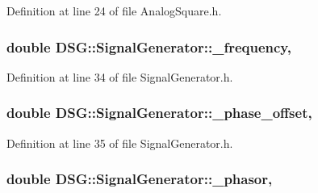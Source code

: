 Definition at line 24 of file Analog\-Square.\-h.

\hypertarget{classDSG_1_1SignalGenerator_a67e296e3506dcdf09402c667cddff9ac}{
\subsubsection[{\-\_\-frequency}]{\setlength{\rightskip}{0pt plus 5cm}double D\-S\-G\-::\-Signal\-Generator\-::\-\_\-frequency\hspace{0.3cm}{\ttfamily [protected]}, {\ttfamily [inherited]}}}\label{classDSG_1_1SignalGenerator_a67e296e3506dcdf09402c667cddff9ac}


Definition at line 34 of file Signal\-Generator.\-h.

\hypertarget{classDSG_1_1SignalGenerator_a9abf9d00c798e0fdca6314f17547758a}{
\subsubsection[{\-\_\-phase\-\_\-offset}]{\setlength{\rightskip}{0pt plus 5cm}double D\-S\-G\-::\-Signal\-Generator\-::\-\_\-phase\-\_\-offset\hspace{0.3cm}{\ttfamily [protected]}, {\ttfamily [inherited]}}}\label{classDSG_1_1SignalGenerator_a9abf9d00c798e0fdca6314f17547758a}


Definition at line 35 of file Signal\-Generator.\-h.

\hypertarget{classDSG_1_1SignalGenerator_ac2271b582bf699275f077ecb642a8cd9}{
\subsubsection[{\-\_\-phasor}]{\setlength{\rightskip}{0pt plus 5cm}double D\-S\-G\-::\-Signal\-Generator\-::\-\_\-phasor\hspace{0.3cm}{\ttfamily [protected]}, {\ttfamily [inherited]}}}\label{classDSG_1_1SignalGenerator_ac2271b582bf699275f077ecb642a8cd9}



